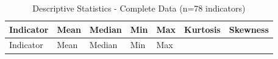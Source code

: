 \documentclass[
  letterpaper,
  DIV=11,
  numbers=noendperiod]{scrartcl}
\begin{document}
\begin{longtable}[]{@{}
  >{\raggedright\arraybackslash}p{}
  >{\raggedleft\arraybackslash}p{}
  >{\raggedleft\arraybackslash}p{}
  >{\raggedleft\arraybackslash}p{}
  >{\raggedleft\arraybackslash}p{}
  >{\raggedleft\arraybackslash}p{}
  >{\raggedleft\arraybackslash}p{}@{}}
\caption{Descriptive Statistics - Complete Data (n=78
indicators)}\tabularnewline
\toprule\noalign{}
\begin{minipage}[b]{\linewidth}\raggedright
Indicator
\end{minipage} & \begin{minipage}[b]{\linewidth}\raggedleft
Mean
\end{minipage} & \begin{minipage}[b]{\linewidth}\raggedleft
Median
\end{minipage} & \begin{minipage}[b]{\linewidth}\raggedleft
Min
\end{minipage} & \begin{minipage}[b]{\linewidth}\raggedleft
Max
\end{minipage} & \begin{minipage}[b]{\linewidth}\raggedleft
Kurtosis
\end{minipage} & \begin{minipage}[b]{\linewidth}\raggedleft
Skewness
\end{minipage} \\
\midrule\noalign{}
\endfirsthead
\toprule\noalign{}
\begin{minipage}[b]{\linewidth}\raggedright
Indicator
\end{minipage} & \begin{minipage}[b]{\linewidth}\raggedleft
Mean
\end{minipage} & \begin{minipage}[b]{\linewidth}\raggedleft
Median
\end{minipage} & \begin{minipage}[b]{\linewidth}\raggedleft
Min
\end{minipage} & \begin{minipage}[b]{\linewidth}\raggedleft
Max
\end{minipage} & \begin{minipage}[b]{\linewidth}\raggedleft

\end{minipage}
\end{longtable}
\end{document}
